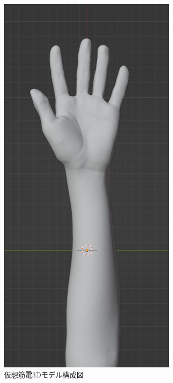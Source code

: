 \documentclass{ltjsarticle}
\begin{document}
\begin{figure}[H]
\begin{minipage}{0.292\columnwidth}
		\end{minipage}
		\hspace{0.3pt}
		\begin{minipage}{0.292\columnwidth}
		\centering
		\includegraphics[width = \columnwidth]{figs/handmeshLat_flont.png}
		\end{minipage}
		\vspace{-10pt}
		\caption{仮想筋電3Dモデル構成図}
		\label{fig:VRhand}
		\end{figure}
		\vspace{-35pt}
\end{document}
